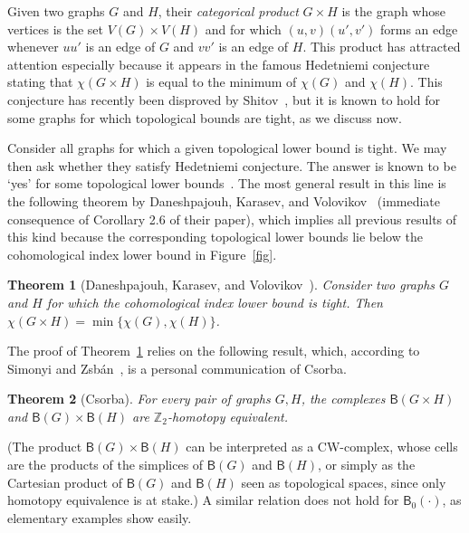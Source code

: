 \documentclass[12pt]{amsart}
\newtheorem{theorem}{Theorem}[section]
\theoremstyle{definition}
\def\Z{\mathbb{Z}}
\def\B{\mathsf{B}}
\begin{document}
Given two graphs $G$ and $H$, their {\em categorical product} $G\times H$ is the graph whose vertices is the set $V(G) \times V(H)$ and for which $(u,v)(u',v')$ forms an edge whenever $uu'$ is an edge of $G$ and $vv'$ is an edge of $H$. This product has attracted attention especially because it appears in the famous Hedetniemi conjecture~\cite{hedetniemi1966homomorphisms} stating that $\chi(G\times H)$ is equal to the minimum of $\chi(G)$ and $\chi(H)$. This conjecture has recently been disproved by Shitov~\cite{shitov2019counterexamples}, but it is known to hold for some graphs for which topological bounds are tight, as we discuss now.


Consider all graphs for which a given topological lower bound is tight. We may then ask whether they satisfy Hedetniemi conjecture. The answer is known to be `yes' for some topological lower bounds~\cite{Dochtermann09,hajiabolhassan2016hedetniemi,hell1979introduction, simonyi2010topological}. The most general result in this line is the following theorem by Daneshpajouh, Karasev, and Volovikov~\cite{daneshpajouh2023hedetniemi} (immediate consequence of Corollary 2.6 of their paper), which implies all previous results of this kind because the corresponding topological lower bounds lie below the cohomological index lower bound in Figure~\ref{fig}.

\begin{theorem}[Daneshpajouh, Karasev, and Volovikov~\cite{daneshpajouh2023hedetniemi}]\label{thm:cohom-hedet}
Consider two graphs $G$ and $H$ for which the cohomological index lower bound is tight. Then $\chi(G \times H) = \min\{\chi(G),\chi(H)\}$.
\end{theorem}


The proof of Theorem~\ref{thm:cohom-hedet} relies on the following result, which, according to Simonyi and Zsb\'an~\cite[Remark 3]{simonyi2010topological}, is a personal communication of Csorba.

\begin{theorem}[{Csorba}]\label{thm:cat-prod}
For every pair of graphs $G,H$, the complexes $\B(G \times H)$ and $\B(G) \times \B(H)$ are $\Z_2$-homotopy equivalent.
\end{theorem}

(The product $\B(G) \times \B(H)$ can be interpreted as a CW-complex, whose cells are the products of the simplices of $\B(G)$ and $\B(H)$, or simply as the Cartesian product of $\B(G)$ and $\B(H)$ seen as topological spaces, since only homotopy equivalence is at stake.) A similar relation does not hold for $\B_0(\cdot)$, as elementary examples show easily.
\end{document}
